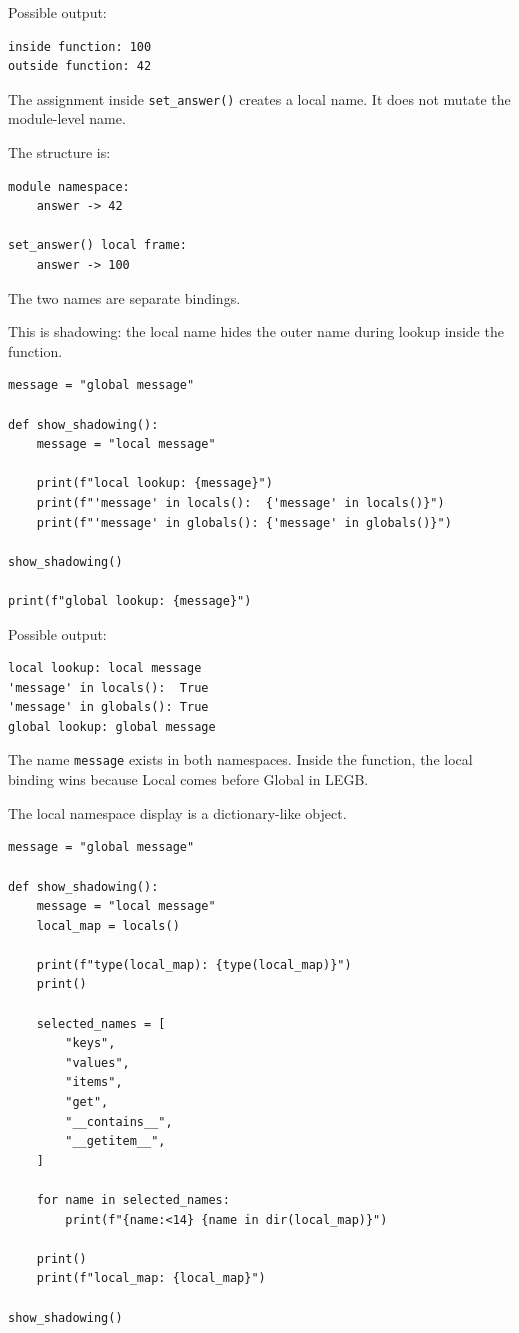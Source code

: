 Possible output:

\begin{verbatim}
inside function: 100
outside function: 42
\end{verbatim}

The assignment inside \texttt{set\_answer()} creates a local name. It does not mutate the module-level name.

The structure is:

\begin{verbatim}
module namespace:
    answer -> 42

set_answer() local frame:
    answer -> 100
\end{verbatim}

The two names are separate bindings.

This is shadowing: the local name hides the outer name during lookup inside the function.

\begin{verbatim}
message = "global message"

def show_shadowing():
    message = "local message"

    print(f"local lookup: {message}")
    print(f"'message' in locals():  {'message' in locals()}")
    print(f"'message' in globals(): {'message' in globals()}")

show_shadowing()

print(f"global lookup: {message}")
\end{verbatim}

Possible output:

\begin{verbatim}
local lookup: local message
'message' in locals():  True
'message' in globals(): True
global lookup: global message
\end{verbatim}

The name \texttt{message} exists in both namespaces. Inside the function, the local binding wins because Local comes before Global in LEGB.

The local namespace display is a dictionary-like object.

\begin{verbatim}
message = "global message"

def show_shadowing():
    message = "local message"
    local_map = locals()

    print(f"type(local_map): {type(local_map)}")
    print()

    selected_names = [
        "keys",
        "values",
        "items",
        "get",
        "__contains__",
        "__getitem__",
    ]

    for name in selected_names:
        print(f"{name:<14} {name in dir(local_map)}")

    print()
    print(f"local_map: {local_map}")

show_shadowing()
\end{verbatim}

